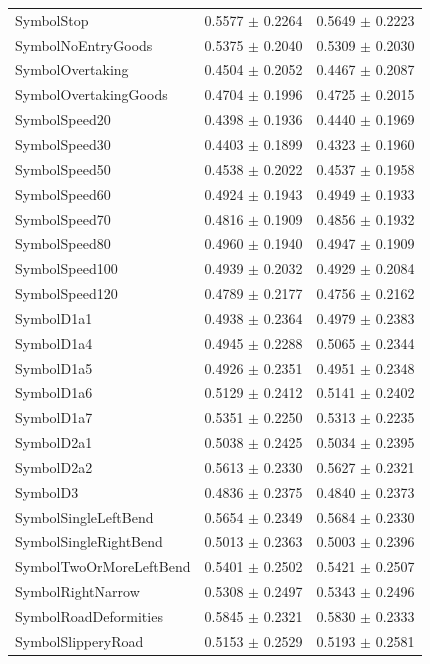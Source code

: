 \begin{longtable}{@{}lrr@{}}
SymbolStop & 0.5577 $\pm$ 0.2264 & 0.5649 $\pm$ 0.2223 \\
SymbolNoEntryGoods & 0.5375 $\pm$ 0.2040 & 0.5309 $\pm$ 0.2030 \\
SymbolOvertaking & 0.4504 $\pm$ 0.2052 & 0.4467 $\pm$ 0.2087 \\
SymbolOvertakingGoods & 0.4704 $\pm$ 0.1996 & 0.4725 $\pm$ 0.2015 \\
SymbolSpeed20 & 0.4398 $\pm$ 0.1936 & 0.4440 $\pm$ 0.1969 \\
SymbolSpeed30 & 0.4403 $\pm$ 0.1899 & 0.4323 $\pm$ 0.1960 \\
SymbolSpeed50 & 0.4538 $\pm$ 0.2022 & 0.4537 $\pm$ 0.1958 \\
SymbolSpeed60 & 0.4924 $\pm$ 0.1943 & 0.4949 $\pm$ 0.1933 \\
SymbolSpeed70 & 0.4816 $\pm$ 0.1909 & 0.4856 $\pm$ 0.1932 \\
SymbolSpeed80 & 0.4960 $\pm$ 0.1940 & 0.4947 $\pm$ 0.1909 \\
SymbolSpeed100 & 0.4939 $\pm$ 0.2032 & 0.4929 $\pm$ 0.2084 \\
SymbolSpeed120 & 0.4789 $\pm$ 0.2177 & 0.4756 $\pm$ 0.2162 \\
SymbolD1a1 & 0.4938 $\pm$ 0.2364 & 0.4979 $\pm$ 0.2383 \\
SymbolD1a4 & 0.4945 $\pm$ 0.2288 & 0.5065 $\pm$ 0.2344 \\
SymbolD1a5 & 0.4926 $\pm$ 0.2351 & 0.4951 $\pm$ 0.2348 \\
SymbolD1a6 & 0.5129 $\pm$ 0.2412 & 0.5141 $\pm$ 0.2402 \\
SymbolD1a7 & 0.5351 $\pm$ 0.2250 & 0.5313 $\pm$ 0.2235 \\
SymbolD2a1 & 0.5038 $\pm$ 0.2425 & 0.5034 $\pm$ 0.2395 \\
SymbolD2a2 & 0.5613 $\pm$ 0.2330 & 0.5627 $\pm$ 0.2321 \\
SymbolD3 & 0.4836 $\pm$ 0.2375 & 0.4840 $\pm$ 0.2373 \\
SymbolSingleLeftBend & 0.5654 $\pm$ 0.2349 & 0.5684 $\pm$ 0.2330 \\
SymbolSingleRightBend & 0.5013 $\pm$ 0.2363 & 0.5003 $\pm$ 0.2396 \\
SymbolTwoOrMoreLeftBend & 0.5401 $\pm$ 0.2502 & 0.5421 $\pm$ 0.2507 \\
SymbolRightNarrow & 0.5308 $\pm$ 0.2497 & 0.5343 $\pm$ 0.2496 \\
SymbolRoadDeformities & 0.5845 $\pm$ 0.2321 & 0.5830 $\pm$ 0.2333 \\
SymbolSlipperyRoad & 0.5153 $\pm$ 0.2529 & 0.5193 $\pm$ 0.2581 \\

\end{longtable}
